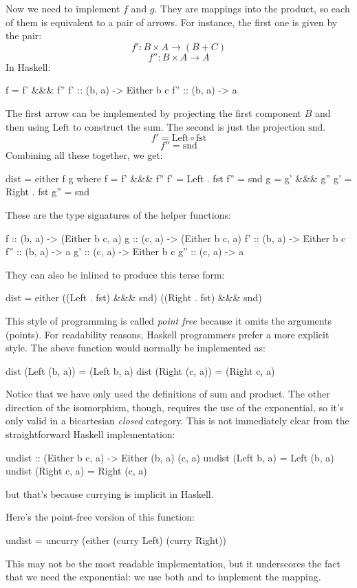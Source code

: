 \documentclass[DaoFP]{subfiles}
\begin{document}
Now we need to implement $f$ and $g$. They are mappings into the product, so each of them is equivalent to a pair of arrows. For instance, the first one is given by the pair:
\[f' \colon B \times A \to (B + C)\]
\[f'' \colon B \times A \to  A\]
In Haskell:
\begin{haskell}
    f = f' &&& f''
    f'  :: (b, a) -> Either b c
    f'' :: (b, a) -> a
\end{haskell}
The first arrow can be implemented by projecting the first component $B$ and then using $\text{Left}$ to construct the sum. The second is just the projection $\text{snd}$.
\[ f' = \text{Left} \circ \text{fst} \]
\[ f'' = \text{snd} \]
Combining all these together, we get:
\begin{haskell}
dist = either f g
  where
    f   = f' &&& f''
    f'  = Left . fst
    f'' = snd
    g   = g' &&& g''
    g'  = Right . fst
    g'' = snd
\end{haskell}
These are the type signatures of the helper functions:
\begin{haskell}
    f   :: (b, a) -> (Either b c, a)
    g   :: (c, a) -> (Either b c, a)
    f'  :: (b, a) -> Either b c
    f'' :: (b, a) -> a
    g'  :: (c, a) -> Either b c
    g'' :: (c, a) -> a
\end{haskell}
They can also be inlined to produce this terse form:
\begin{haskell}
dist = either ((Left . fst) &&& snd) ((Right . fst) &&& snd)
\end{haskell}
This style of programming is called \emph{point free} because it omits the arguments (points). For readability reasons, Haskell programmers prefer a more explicit style. The above function would normally be implemented as:
\begin{haskell}
dist (Left  (b, a)) = (Left b, a)
dist (Right (c, a)) = (Right c, a)
\end{haskell}

Notice that we have only used the definitions of sum and product. The other direction of the isomorphism, though, requires the use of the exponential, so it's only valid in a bicartesian \emph{closed} category. This is not immediately clear from the straightforward Haskell implementation:
\begin{haskell}
undist :: (Either b c, a) -> Either (b, a) (c, a)
undist (Left b, a)  = Left (b, a)
undist (Right c, a) = Right (c, a)
\end{haskell}
but that's because currying is implicit in Haskell. 

Here's the point-free version of this function:
\begin{haskell}
undist = uncurry (either (curry Left) (curry Right))
\end{haskell}
This may not be the most readable implementation, but it underscores the fact that we need the exponential: we use both  and  to implement the mapping.
\end{document}
